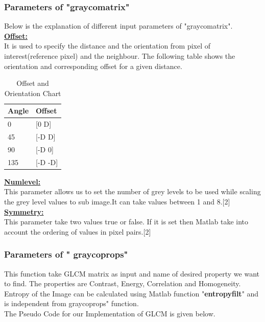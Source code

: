 \documentclass{article}
\begin{document}
\subsubsection{Parameters of "graycomatrix"}
Below is the explanation of different input parameters of "graycomatrix".
\\
\underline{\textbf{Offset:}}\\
 It is used to specify the distance and the orientation from pixel of interest(reference pixel) and the neighbour. The following table shows the orientation  and corresponding offset for a given distance.
 \begin{table}[H]
     \begin{tabular}{|l|l|}
     \hline
     \textbf{Angle} & \textbf{Offset}  \\ \hline
     0     & [0 D]   \\ \hline
     45    & [-D D]  \\ \hline
     90    & [-D 0]  \\ \hline
     135   & [-D -D] \\ \hline
     \end{tabular}
     \caption{Offset and Orientation Chart}
 \end{table}
  \underline{\textbf{Numlevel:}}\\
 This parameter allows us to set the number of grey levels to be used while scaling the grey level values to sub image.It can take values between 1 and 8.[2]
 \\
  \underline{\textbf{Symmetry:}}\\
  This parameter take two values true or false. If it is set then Matlab take into account the ordering of values in pixel pairs.[2]
  \subsubsection{Parameters of " graycoprops"}
  This function take GLCM matrix as input and name of desired property we want to find. The properties are Contrast, Energy, Correlation and Homogeneity.\\
  Entropy of the Image can be calculated using Matlab function "\textbf{entropyfilt}" and is independent from graycoprops" function.\\
  The Pseudo Code for our Implementation of GLCM is given below.
\end{document}
